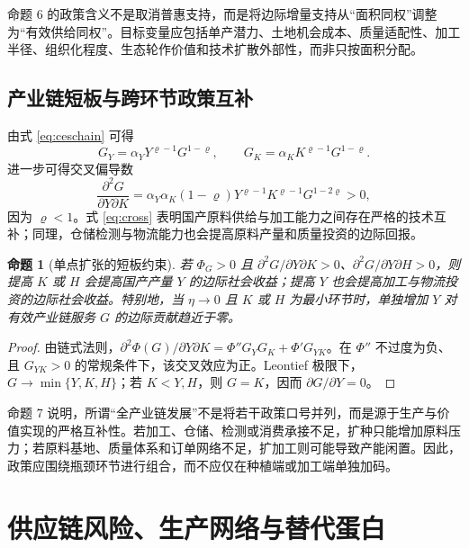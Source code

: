 \documentclass[UTF8,zihao=-4,fontset=fandol]{ctexart}
\numberwithin{equation}{section}
\newtheorem{proposition}{命题}
\theoremstyle{definition}
\theoremstyle{remark}
\begin{document}
命题 6 的政策含义不是取消普惠支持，而是将边际增量支持从“面积同权”调整为“有效供给同权”。目标变量应包括单产潜力、土地机会成本、质量适配性、加工半径、组织化程度、生态轮作价值和技术扩散外部性，而非只按面积分配。

\subsection{产业链短板与跨环节政策互补}

由式 \eqref{eq:ceschain} 可得
\begin{equation}
 G_Y=\alpha_YY^{\varrho-1}G^{1-\varrho},\qquad
 G_K=\alpha_KK^{\varrho-1}G^{1-\varrho}.
 \label{eq:chainmarginal}
\end{equation}
进一步可得交叉偏导数
\begin{equation}
 \frac{\partial^2G}{\partial Y\partial K}
 =\alpha_Y\alpha_K(1-\varrho)Y^{\varrho-1}K^{\varrho-1}G^{1-2\varrho}>0,
 \label{eq:cross}
\end{equation}
因为 $\varrho<1$。式 \eqref{eq:cross} 表明国产原料供给与加工能力之间存在严格的技术互补；同理，仓储检测与物流能力也会提高原料产量和质量投资的边际回报。

\begin{proposition}[单点扩张的短板约束]
若 $\Phi_G>0$ 且 $\partial^2G/\partial Y\partial K>0$、$\partial^2G/\partial Y\partial H>0$，则提高 $K$ 或 $H$ 会提高国产产量 $Y$ 的边际社会收益；提高 $Y$ 也会提高加工与物流投资的边际社会收益。特别地，当 $\eta\rightarrow0$ 且 $K$ 或 $H$ 为最小环节时，单独增加 $Y$ 对有效产业链服务 $G$ 的边际贡献趋近于零。
\end{proposition}

\begin{proof}
由链式法则，$\partial^2\Phi(G)/\partial Y\partial K=\Phi''G_YG_K+\Phi'G_{YK}$。在 $\Phi''$ 不过度为负、且 $G_{YK}>0$ 的常规条件下，该交叉效应为正。Leontief 极限下，$G\rightarrow\min\{Y,K,H\}$；若 $K<Y,H$，则 $G=K$，因而 $\partial G/\partial Y=0$。\end{proof}

命题 7 说明，所谓“全产业链发展”不是将若干政策口号并列，而是源于生产与价值实现的严格互补性。若加工、仓储、检测或消费承接不足，扩种只能增加原料压力；若原料基地、质量体系和订单网络不足，扩加工则可能导致产能闲置。因此，政策应围绕瓶颈环节进行组合，而不应仅在种植端或加工端单独加码。

\section{供应链风险、生产网络与替代蛋白}
\end{document}
